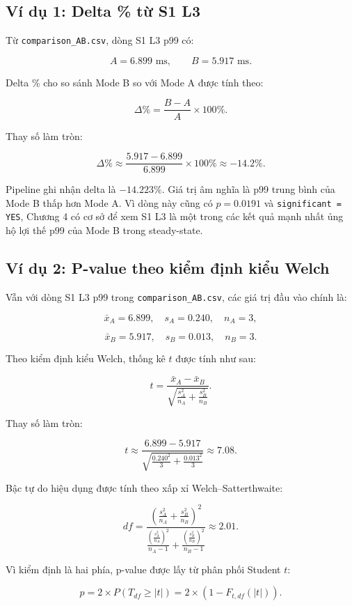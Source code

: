 \subsection{Ví dụ 1: Delta \% từ S1 L3}

Từ \texttt{comparison\_AB.csv}, dòng S1 L3 p99 có:

\[
A = 6.899 \text{ ms}, \qquad B = 5.917 \text{ ms}.
\]

Delta \% cho so sánh Mode B so với Mode A được tính theo:

\[
\Delta\% = \frac{B - A}{A} \times 100\%.
\]

Thay số làm tròn:

\[
\Delta\% \approx \frac{5.917 - 6.899}{6.899} \times 100\% \approx -14.2\%.
\]

Pipeline ghi nhận delta là \(-14.223\%\). Giá trị âm nghĩa là p99 trung bình của Mode B thấp hơn Mode A. Vì dòng này cũng có \(p = 0.0191\) và \texttt{significant = YES}, Chương 4 có cơ sở để xem S1 L3 là một trong các kết quả mạnh nhất ủng hộ lợi thế p99 của Mode B trong steady-state.

\subsection{Ví dụ 2: P-value theo kiểm định kiểu Welch}

Vẫn với dòng S1 L3 p99 trong \texttt{comparison\_AB.csv}, các giá trị đầu vào chính là:

\[
\bar{x}_A = 6.899,\quad s_A = 0.240,\quad n_A = 3,
\]

\[
\bar{x}_B = 5.917,\quad s_B = 0.013,\quad n_B = 3.
\]

Theo kiểm định kiểu Welch, thống kê \(t\) được tính như sau:

\[
t =
\frac{\bar{x}_A-\bar{x}_B}
{\sqrt{\frac{s_A^2}{n_A}+\frac{s_B^2}{n_B}}}.
\]

Thay số làm tròn:

\[
t \approx
\frac{6.899-5.917}
{\sqrt{\frac{0.240^2}{3}+\frac{0.013^2}{3}}}
\approx 7.08.
\]

Bậc tự do hiệu dụng được tính theo xấp xỉ Welch--Satterthwaite:

\[
df =
\frac{
\left(\frac{s_A^2}{n_A}+\frac{s_B^2}{n_B}\right)^2
}{
\frac{\left(\frac{s_A^2}{n_A}\right)^2}{n_A-1}
+
\frac{\left(\frac{s_B^2}{n_B}\right)^2}{n_B-1}
}
\approx 2.01.
\]

Vì kiểm định là hai phía, p-value được lấy từ phân phối Student \(t\):

\[
p = 2 \times P(T_{df} \ge |t|)
  = 2 \times \left(1 - F_{t,df}(|t|)\right).
\]


